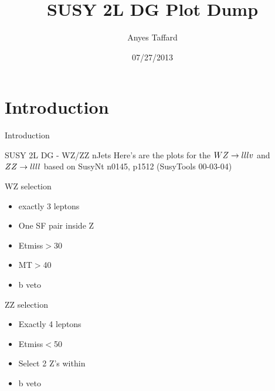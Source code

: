 \documentclass[10pt]{beamer}
\begin{document}
\author{Anyes Taffard}
\date{07/27/2013}

\title[SUSY 2L DG WZ/ZZ CR]{SUSY 2L DG Plot Dump}

\begin{frame}[plain]
  \titlepage
\end{frame}

\section{Introduction}
\begin{frame}{Introduction}
  \begin{block}{SUSY 2L DG - WZ/ZZ nJets }
    Here's are the plots for the $WZ\rightarrow lllv$ and $ZZ \rightarrow llll$ based on SusyNt n0145, p1512 (SusyTools 00-03-04)



    WZ selection
    \begin{itemize}
      \item exactly 3 leptons 
      \item One SF pair inside Z   
      \item Etmiss$>$30
      \item MT$>$40
      \item b veto  
    \end{itemize}
    ZZ selection
    \begin{itemize}    
      \item Exactly 4 leptons
      \item Etmiss$<$50
      \item Select 2 Z's within   
      \item b veto
    \end{itemize}

  \end{block}
\end{frame}


\end{document}
